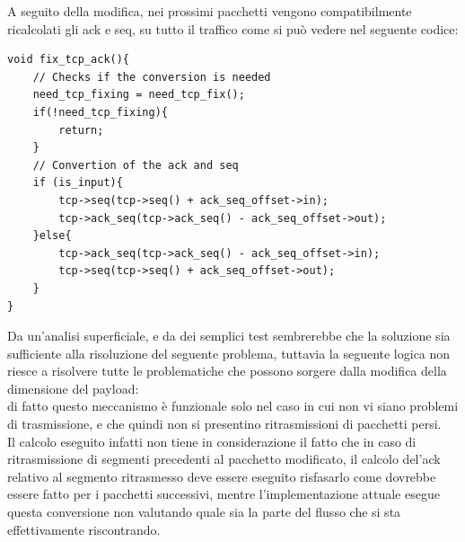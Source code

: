 A seguito della modifica, nei prossimi pacchetti vengono compatibilmente ricalcolati gli ack e seq, su tutto il traffico come si può vedere nel seguente codice:

\begin{listing}[H]
    \begin{verbatim}
void fix_tcp_ack(){
    // Checks if the conversion is needed
    need_tcp_fixing = need_tcp_fix();
    if(!need_tcp_fixing){
        return;
    }
    // Convertion of the ack and seq
    if (is_input){
        tcp->seq(tcp->seq() + ack_seq_offset->in);
        tcp->ack_seq(tcp->ack_seq() - ack_seq_offset->out);
    }else{
        tcp->ack_seq(tcp->ack_seq() - ack_seq_offset->in);
        tcp->seq(tcp->seq() + ack_seq_offset->out);
    }
}
\end{verbatim}
\end{listing}

Da un'analisi superficiale, e da dei semplici test sembrerebbe che la soluzione sia sufficiente alla risoluzione del seguente problema, tuttavia la seguente logica
non riesce a risolvere tutte le problematiche che possono sorgere dalla modifica della dimensione del payload:\\
di fatto questo meccanismo è funzionale solo nel caso in cui non vi siano problemi di trasmissione, e che quindi non si presentino ritrasmissioni di pacchetti persi.\\

Il calcolo eseguito infatti non tiene in considerazione il fatto che in caso di ritrasmissione di segmenti precedenti al pacchetto modificato, il calcolo
del'ack relativo al segmento ritrasmesso deve essere eseguito risfasarlo come dovrebbe essere fatto per i pacchetti successivi, mentre l'implementazione
attuale esegue questa conversione non valutando quale sia la parte del flusso che si sta effettivamente riscontrando.\\

